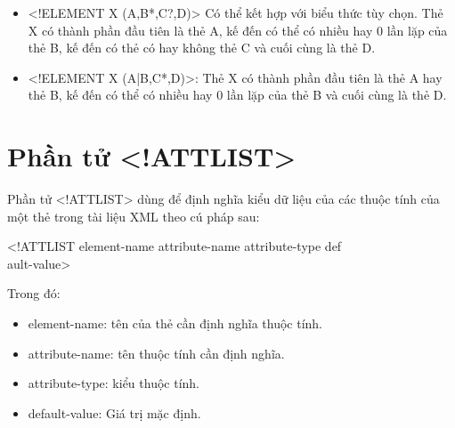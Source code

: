 \begin{itemize}
\item 	 {\ttfamily <!ELEMENT X (A,B*,C?,D)>} Có thể kết hợp với biểu thức tùy chọn. Thẻ {\ttfamily X} có thành phần đầu tiên là thẻ {\ttfamily A}, kế đến có thể có nhiều hay 0 lần lặp của thẻ {\ttfamily B}, kế đến có thẻ có hay không thẻ {\ttfamily C} và cuối cùng là thẻ {\ttfamily D}.
\item 	 {\ttfamily <!ELEMENT X (A|B,C*,D)>}: Thẻ {\ttfamily X} có thành phần đầu tiên là thẻ {\ttfamily A} hay thẻ {\ttfamily B}, kế đến có thể có nhiều hay 0 lần lặp của thẻ {\ttfamily B} và cuối cùng là thẻ {\ttfamily D}.
 \end{itemize}
 
 \section{ Phần tử <!ATTLIST>}
 \label{muc2.4}
  Phần tử {\ttfamily  <!ATTLIST> } dùng để định nghĩa kiểu dữ liệu của các thuộc tính của một thẻ trong tài liệu XML theo cú pháp sau:
  
   {\ttfamily  <!ATTLIST element-name attribute-name   attribute-type def\\ault-value>}
    
   Trong đó:
   \begin{itemize}
   

  \item  {\ttfamily element-name}: tên của thẻ cần định nghĩa thuộc tính.
   
  \item   {\ttfamily attribute-name}: tên thuộc tính cần định nghĩa.
   
  \item   {\ttfamily attribute-type}: kiểu thuộc tính.
   
   \item  {\ttfamily default-value}: Giá trị mặc định.
\end{itemize}

